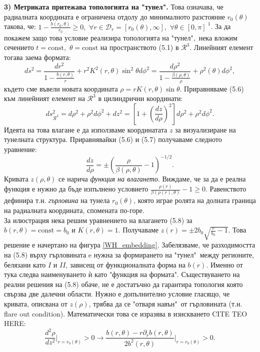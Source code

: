 \textbf{3) Метриката притежава топологията на "тунел".} Това означава, че радиалната координата е ограничена отдолу до минималното разстояние $r_0(\theta)$ такова, че: $1 - \frac{b(r_0,\theta)}{r_0} \ge 0 ,\,\,\forall r\in \mathcal{D}_r = [r_0(\theta),\infty],\,\,\forall\theta\in[0,\pi]^{\,\,1}$. За да покажем защо това условие реализира топологията на "тунел"$,$ нека вложим сечението $t = \text{const},\,\,\theta = \text{const}$ на пространството (5.1) в $\mathcal{R}^3$. Линейният елемент тогава заема формата:
\begin{equation}
	ds^2 = \frac{dr^2}{1 - \frac{b(r,\theta)}{r}} + r^2K^2(r,\theta)\sin^2\theta d\phi^2 = \frac{d\rho^2}{1 - \frac{\beta(\rho,\theta)}{\rho}} + \rho^2(\theta)d\phi^2,
\end{equation}
където сме въвели новата координата $\rho = rK(r,\theta)\sin\theta$. Приравняваме (5.6) към линейният елемент на $\mathcal{R}^3$ в цилиндрични координати:
\begin{equation}
	ds^2_{\mathcal{R}^3} = d\rho^2 + \rho^2d\phi^2 + dz^2 = \left[1 + \left(\frac{dz}{d\rho}\right)^2\right]d\rho^2 + \rho^2d\phi^2.
\end{equation}
Идеята на това влагане е да използваме координатата $z$ за визуализиране на тунелната структура. Приравнявайки (5.6) и (5.7) получаваме следното уравнение:
\begin{equation}
	\frac{dz}{d\rho} = \pm \left(\frac{\rho}{\beta(\rho,\theta)} - 1\right)^{-1/2}.
\end{equation}
Кривата $z(\rho,\theta)$ се нарича \emph{функция на влагането}. Виждаме, че за да е реална функция е нужно да бъде изпълнено условието $\frac{\rho(r)}{\beta(\rho(r),\theta)}-1\ge 0$. Равенството дефинира т.н. \emph{гърловина} на тунела $r_0(\theta)$, която играе ролята на долната граница на радиалната координата, спомената по-горе.\\
За илюстрация нека решим уравнението на влагането (5.8) за $b(r,\theta) = \text{const} = b_0$ и $K(r,\theta) = 1$. Получаваме $z(r) = \pm 2b_0\sqrt{\frac{r}{b_0} - 1}$. Това решение е начертано на фигура \ref{WH_embedding}. Забелязваме, че разходимостта на (5.8) върху гърловината e нужна за формирането на "тунел"$\,$ между регионите, белязани като $I$ и $II$, зависещ от функционалната форма на $b(r)$. Именно от тука следва наименуването ѝ като "функция на формата". Съществуването на реални решения на (5.8) обаче, не е достатъчно да гарантира топология която свързва две далечни области. Нужно е допълнително условие гласящо, че кривата, описвана от $z(\rho)$, трябва да се "отваря навън"$\,$ от гърловината (т.н. flare out condition). Математически това се изразява в изискването CITE TEO HERE:
\begin{equation}
	\frac{d^2\rho}{dz^2}\bigg\vert_{r = r_0(\theta)} > 0\rightarrow \frac{b(r,\theta) - r\partial_rb(r,\theta)}{2b^2(r,\theta)}\bigg\vert_{r = r_0(\theta)} > 0.
\end{equation}\newline

